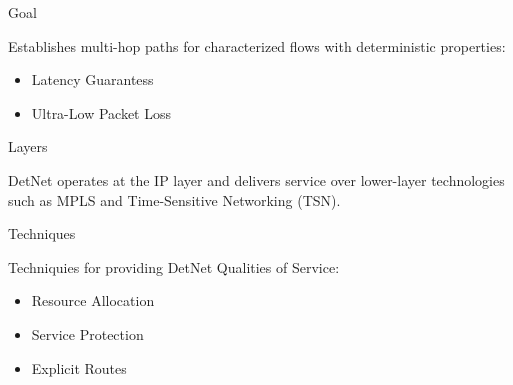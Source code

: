\documentclass{beamer}
\begin{document}
\begin{frame}{}
        \begin{block}{Goal}
                \par
                Establishes multi-hop paths for characterized flows with deterministic properties:
                \begin{itemize}
                        \item Latency Guarantess
                        \item Ultra-Low Packet Loss
                \end{itemize}
        \end{block}

        \begin{block}{Layers}
                \par
                DetNet operates at the IP layer and delivers service over lower-layer technologies such as MPLS and Time-Sensitive Networking (TSN).
        \end{block}
\end{frame}

\begin{frame}{Techniques}
        \par
        Techniquies for providing DetNet Qualities of Service:~\cite{Finn2019}
        \begin{itemize}
                \item Resource Allocation
                \item Service Protection
                \item Explicit Routes
        \end{itemize}
\end{frame}

\begin{frame}{}
        \printbibliography%
\end{frame}
\end{document}
